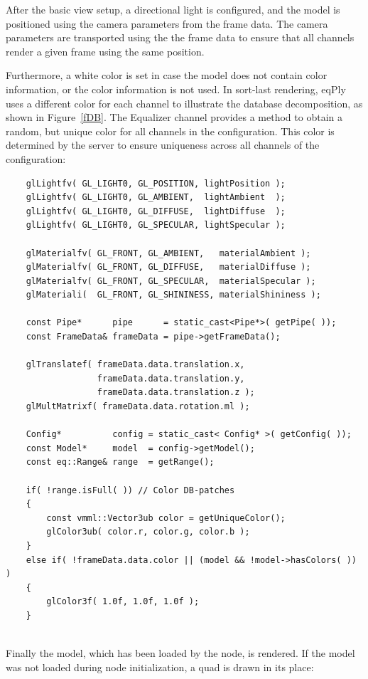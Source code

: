 \documentclass[10pt,a4]{scrartcl}
\newcommand{\fig}[1]{Figure~\ref{#1}}
\begin{document}
After the basic view setup, a directional light is configured, and the
model is positioned using the camera parameters from the frame data. The
camera parameters are transported using the the frame data to ensure
that all channels render a given frame using the same position.

Furthermore, a white color is set in case the model does not contain
color information, or the color information is not used. In
sort-last rendering, \textsf{eqPly} uses a different color for each
channel to illustrate the database decomposition, as shown in
\fig{fDB}. The Equalizer channel provides a method to obtain a random,
but unique color for all channels in the configuration. This color is
determined by the server to ensure uniqueness across all channels of the
configuration:

{\footnotesize\begin{lstlisting}
    glLightfv( GL_LIGHT0, GL_POSITION, lightPosition );
    glLightfv( GL_LIGHT0, GL_AMBIENT,  lightAmbient  );
    glLightfv( GL_LIGHT0, GL_DIFFUSE,  lightDiffuse  );
    glLightfv( GL_LIGHT0, GL_SPECULAR, lightSpecular );

    glMaterialfv( GL_FRONT, GL_AMBIENT,   materialAmbient );
    glMaterialfv( GL_FRONT, GL_DIFFUSE,   materialDiffuse );
    glMaterialfv( GL_FRONT, GL_SPECULAR,  materialSpecular );
    glMateriali(  GL_FRONT, GL_SHININESS, materialShininess );

    const Pipe*      pipe      = static_cast<Pipe*>( getPipe( ));
    const FrameData& frameData = pipe->getFrameData();

    glTranslatef( frameData.data.translation.x,
                  frameData.data.translation.y,
                  frameData.data.translation.z );
    glMultMatrixf( frameData.data.rotation.ml );

    Config*          config = static_cast< Config* >( getConfig( ));
    const Model*     model  = config->getModel();
    const eq::Range& range  = getRange();

    if( !range.isFull( )) // Color DB-patches
    {
        const vmml::Vector3ub color = getUniqueColor();
        glColor3ub( color.r, color.g, color.b );
    }
    else if( !frameData.data.color || (model && !model->hasColors( )) )
    {
        glColor3f( 1.0f, 1.0f, 1.0f );
    }
    
\end{lstlisting}}

Finally the model, which has been loaded by the node, is rendered. If
the model was not loaded during node initialization, a quad is drawn in
its place:
\end{document}
